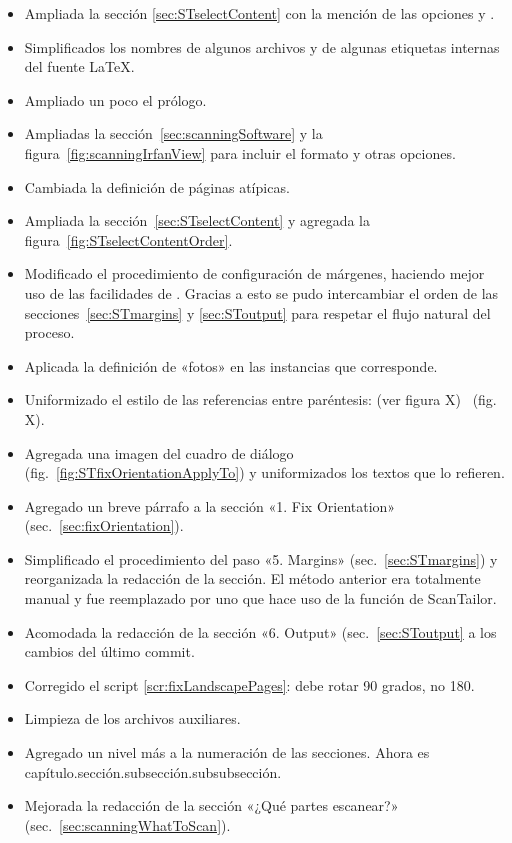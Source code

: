 \documentclass[%
	a5paper,
	10pt,
	twoside,
	openright,
	final,
]{memoir}
\begin{document}
{\begin{itemize}
\begin{itemize}
				\item Ampliada la sección \ref{sec:STselectContent} con la mención de las opciones  y .
				\item Simplificados los nombres de algunos archivos y de algunas etiquetas internas del fuente \LaTeX.
				\item Ampliado un poco el prólogo.
				\item Ampliadas la sección~\ref{sec:scanningSoftware} y la figura~\ref{fig:scanningIrfanView} para incluir el formato \png y otras opciones.
				\item Cambiada la definición de páginas atípicas.
				\item Ampliada la sección~\ref{sec:STselectContent} y agregada la figura~\ref{fig:STselectContentOrder}.
				\item Modificado el procedimiento de configuración de márgenes, haciendo mejor uso de las facilidades de \scantailor. Gracias a esto se pudo intercambiar el orden de las secciones~\ref{sec:STmargins} y \ref{sec:SToutput} para respetar el flujo natural del proceso.
				\item Aplicada la definición de «fotos» en las instancias que corresponde.
				\item Uniformizado el estilo de las referencias entre paréntesis: (ver figura X) \faLongArrowAltRight\ (fig. X).
				\item Agregada una imagen del cuadro de diálogo  (fig.~\ref{fig:STfixOrientationApplyTo}) y uniformizados los textos que lo refieren.
				\item Agregado un breve párrafo a la sección «1. Fix Orientation» (sec.~\ref{sec:fixOrientation}).
				\item Simplificado el procedimiento del paso «5. Margins» (sec.~\ref{sec:STmargins}) y reorganizada la redacción de la sección. El método anterior era totalmente manual y fue reemplazado por uno que hace uso de la función  de ScanTailor.
				\item Acomodada la redacción de la sección «6. Output» (sec.~\ref{sec:SToutput} a los cambios del último commit.
				\item Corregido el script \ref{scr:fixLandscapePages}: debe rotar 90 grados, no 180.
				\item Limpieza de los archivos auxiliares.
				\item Agregado un nivel más a la numeración de las secciones. Ahora es capítulo.sección.subsección.subsubsección.
				\item Mejorada la redacción de la sección «¿Qué partes escanear?» (sec.~\ref{sec:scanningWhatToScan}).

\end{itemize}
\end{itemize}}
\end{document}
